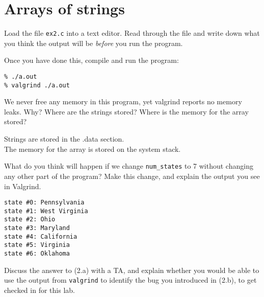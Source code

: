 \section*{Arrays of strings}

Load the file \lstinline'ex2.c' into a text editor. Read through the
file and write down what you think the output will be \emph{before}
you run the program.

\par\answerline{}
\par\answerline{}
\par\answerline{}

Once you have done this, compile and run the program:
\begin{lstlisting}[language={[coin]C}]
% gcc -Wall -Wextra -Werror -Wshadow -std=c99 -pedantic -g ex2.c
% ./a.out
% valgrind ./a.out
\end{lstlisting}

\begin{part}
  We never free any memory in this program, yet valgrind reports no
  memory leaks.  Why? Where are the strings stored? Where is the memory
  for the array stored?

\begin{solution}
Strings are stored in the .data section.\\
The memory for the array is stored on the system stack.
\end{solution}
\end{part}

\begin{part}
  What do you think will happen if we change \lstinline'num_states' to
  7 without changing any other part of the program? Make this change,
  and explain the output you see in Valgrind.

\begin{solution}
\begin{lstlisting}[language={[coin]C}]
state #0: Pennsylvania
state #1: West Virginia
state #2: Ohio
state #3: Maryland
state #4: California
state #5: Virginia
state #6: Oklahoma
\end{lstlisting}
\end{solution}
\end{part}

Discuss the answer to (2.a) with a TA, and explain whether you would
be able to use the output from \lstinline'valgrind' to identify the
bug you introduced in (2.b), to get checked in for this lab.

\twoPT
